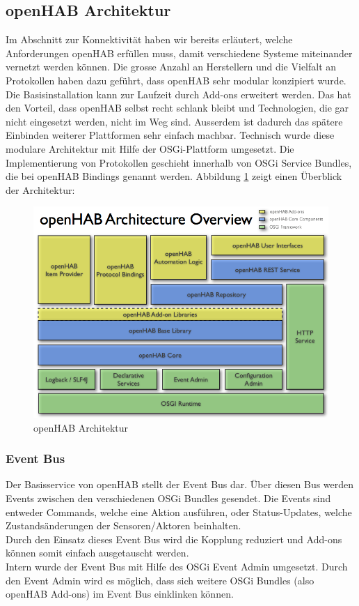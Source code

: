 \subsection{openHAB Architektur}
Im Abschnitt zur Konnektivität haben wir bereits erläutert, welche Anforderungen openHAB erfüllen muss, damit verschiedene Systeme miteinander vernetzt werden können. Die grosse Anzahl an Herstellern und die Vielfalt an Protokollen haben dazu geführt, dass openHAB sehr modular konzipiert wurde. Die Basisinstallation kann zur Laufzeit durch Add-ons erweitert werden. Das hat den Vorteil, dass openHAB selbst recht schlank bleibt und Technologien, die gar nicht eingesetzt werden, nicht im Weg sind. Ausserdem ist dadurch das spätere Einbinden weiterer Plattformen sehr einfach machbar. Technisch wurde diese modulare Architektur mit Hilfe der OSGi-Plattform umgesetzt. Die Implementierung von Protokollen geschieht innerhalb von OSGi Service Bundles, die bei openHAB Bindings genannt werden. Abbildung \ref{fig:ohArch} zeigt einen Überblick der Architektur:

\begin{figure}[H]
	\centering
		\includegraphics[scale=0.45]{report/img/openHAB_architecture}
	\caption{openHAB Architektur}
	\label{fig:ohArch}
\end{figure}

\subsubsection{Event Bus}
Der Basisservice von openHAB stellt der Event Bus dar. Über diesen Bus werden Events zwischen den verschiedenen OSGi Bundles gesendet. Die Events sind entweder Commands, welche eine Aktion ausführen, oder Status-Updates, welche Zustandsänderungen der Sensoren/Aktoren beinhalten. \\
Durch den Einsatz dieses Event Bus wird die Kopplung reduziert und Add-ons können somit einfach ausgetauscht werden. \\
Intern wurde der Event Bus mit Hilfe des OSGi Event Admin umgesetzt. Durch den Event Admin wird es möglich, dass sich weitere OSGi Bundles (also openHAB Add-ons) im Event Bus einklinken können.

